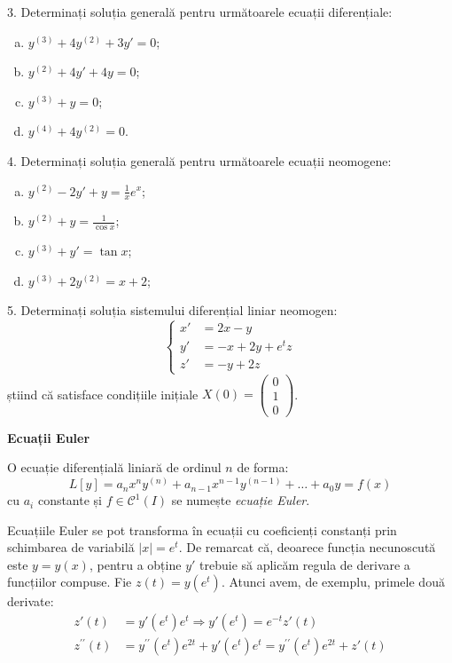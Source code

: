 \documentclass[11pt,a4paper]{article}
\newcommand\kal{\mathcal}
\theoremstyle{dotless}
\theoremstyle{dotlessdr}
\begin{document}
\vspace{1cm}

3. Determinați soluția generală pentru următoarele ecuații diferențiale:
\begin{enumerate}[(a)]
\item $y^{(3)} + 4y^{(2)} + 3y' = 0$;
\item $y^{(2)} + 4y' + 4y = 0$;
\item $y^{(3)} + y = 0$;
\item $y^{(4)} + 4y^{(2)} = 0$.
\end{enumerate}

\vspace{1cm}

4. Determinați soluția generală pentru următoarele ecuații neomogene:
\begin{enumerate}[(a)]
\item $y^{(2)} - 2y' + y = \frac{1}{x} e^x$;
\item $y^{(2)} + y = \frac{1}{\cos x}$;
\item $y^{(3)} + y' = \tan x$;
\item $y^{(3)} + 2y^{(2)} = x + 2$;
\end{enumerate}

\vspace{1cm}

5. Determinați soluția sistemului diferențial liniar neomogen:
\[
  \begin{cases}
    x' &= 2x - y \\
    y' &= -x + 2y + e^t z \\
    z' &= -y + 2z
  \end{cases}
\]
știind că satisface condițiile inițiale $X(0) = \begin{pmatrix} 0 \\ 1 \\ 0 \end{pmatrix}$.

\vspace{1cm}

\textbf{Ecuații Euler}

O ecuație diferențială liniară de ordinul $n$ de forma:
\[
  L[y] = a_n x^n y^{(n)} + a_{n-1} x^{n-1} y^{(n-1)} + \dots + a_0 y = f(x)
\]
cu $a_i$ constante și $f \in \kal{C}^1(I)$ se numește \emph{ecuație Euler}.


Ecuațiile Euler se pot transforma în ecuații cu coeficienți constanți prin schimbarea
de variabilă $|x| = e^t$. De remarcat că, deoarece funcția necunoscută este $y = y(x)$,
pentru a obține $y'$ trebuie să aplicăm regula de derivare a funcțiilor compuse.
Fie $z(t) = y(e^t)$. Atunci avem, de exemplu, primele două derivate:
\begin{align*}
  z'(t) &= y'(e^t) e^t \Rightarrow y'(e^t) = e^{-t} z'(t) \\
  z^{\prime\prime}(t) &= y^{\prime\prime}(e^t) e^{2t} + y'(e^t)e^t =
                        y^{\prime\prime}(e^t) e^{2t} + z'(t)
\end{align*}
\end{document}
